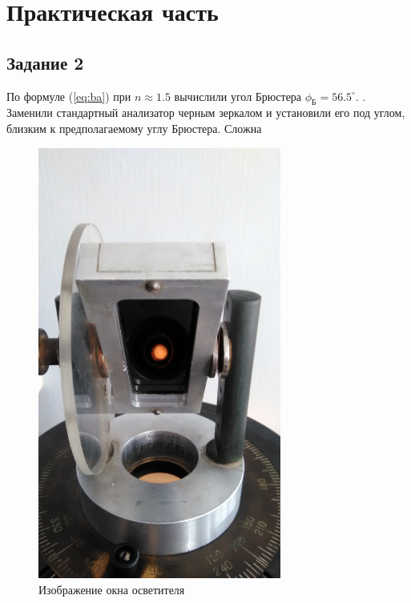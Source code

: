 \section{Практическая часть}
\subsection{Задание 2}

По формуле (\ref{eq:ba}) при $n\approx1.5$ вычислили угол Брюстера $\phi_{\text{Б}}=56.5^{\circ}$. . Заменили стандартный анализатор черным зеркалом и установили его под углом, близким к предполагаемому углу Брюстера.  
Сложна

\begin{figure}[H]
	\centering
	\includegraphics[width=8cm]{pic/b1.jpg}
	\caption{Изображение окна осветителя}
	\label{fig:figure3}
\end{figure}

